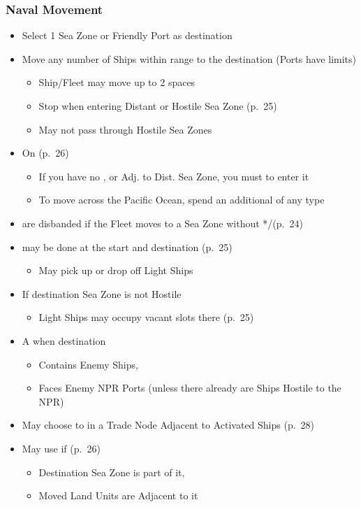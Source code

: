 \documentclass[10pt]{article}
\begin{document}
\subsubsection*{Naval Movement}
\begin{itemize}
	\item Select 1 Sea Zone or Friendly Port as destination
	\item Move any number of Ships within range to the destination (Ports have limits)
	\begin{itemize}
		\item Ship/Fleet may move up to 2 spaces
		\item Stop when entering Distant or Hostile Sea Zone (p.~25)
		\item May not pass through Hostile Sea Zones
	\end{itemize}
	\item On  (p.~26)
	\begin{itemize}
		\item If you have no \claim, \town or \vassal Adj. to Dist. Sea Zone, you must  to enter it
		\item To move across the Pacific Ocean, spend an additional \monarchpower of any type
	\end{itemize}
	\item {} are disbanded if the Fleet moves to a Sea Zone without */\textdagger\xspace(p.~24)
	\item {} may be done at the start and destination (p.~25)
	\begin{itemize}
		\item May pick up or drop off Light Ships
	\end{itemize}
	\item If destination Sea Zone is not Hostile
	\begin{itemize}
		\item Light Ships may occupy vacant  slots there (p. 25)
	\end{itemize}
	\item A  when destination
	\begin{itemize}
		\item Contains Enemy Ships, 
		\item Faces Enemy NPR Ports (unless there already are Ships Hostile to the NPR)
	\end{itemize}
	\item May choose to  in a Trade Node Adjacent to Activated Ships (p.~28)
	\item {}May use  if (p.~26)
	\begin{itemize}
		\item Destination Sea Zone is part of it, 
		\item Moved Land Units are Adjacent to it
	\end{itemize}
\end{itemize}
\end{document}
